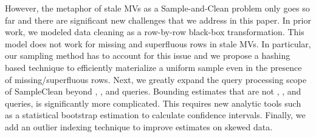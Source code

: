 However, the metaphor of stale MVs as a Sample-and-Clean problem only goes so far and there are significant new challenges that we address in this paper.
In prior work, we modeled data cleaning as a row-by-row black-box transformation.
This model does not work for missing and superfluous rows in stale MVs.
In particular, our sampling method has to account for this issue and we propose a hashing based technique to efficiently materialize a uniform sample even in the presence of missing/superfluous rows.
Next, we greatly expand the query processing scope of SampleClean beyond \sumfunc, \countfunc, and \avgfunc queries.
Bounding estimates that are not \sumfunc, \countfunc, and \avgfunc queries, is significantly more complicated.
This requires new analytic tools such as a statistical bootstrap estimation to calculate confidence intervals.
Finally, we add an outlier indexing technique to improve estimates on skewed data.


